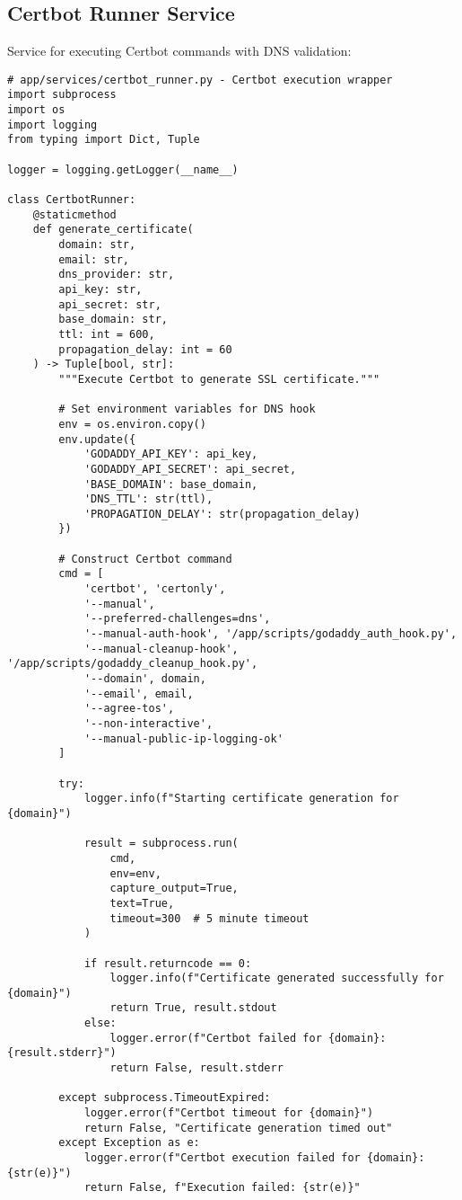 \subsection{Certbot Runner Service}

Service for executing Certbot commands with DNS validation:

\begin{verbatim}
# app/services/certbot_runner.py - Certbot execution wrapper
import subprocess
import os
import logging
from typing import Dict, Tuple

logger = logging.getLogger(__name__)

class CertbotRunner:
    @staticmethod
    def generate_certificate(
        domain: str,
        email: str,
        dns_provider: str,
        api_key: str,
        api_secret: str,
        base_domain: str,
        ttl: int = 600,
        propagation_delay: int = 60
    ) -> Tuple[bool, str]:
        """Execute Certbot to generate SSL certificate."""
        
        # Set environment variables for DNS hook
        env = os.environ.copy()
        env.update({
            'GODADDY_API_KEY': api_key,
            'GODADDY_API_SECRET': api_secret,
            'BASE_DOMAIN': base_domain,
            'DNS_TTL': str(ttl),
            'PROPAGATION_DELAY': str(propagation_delay)
        })
        
        # Construct Certbot command
        cmd = [
            'certbot', 'certonly',
            '--manual',
            '--preferred-challenges=dns',
            '--manual-auth-hook', '/app/scripts/godaddy_auth_hook.py',
            '--manual-cleanup-hook', '/app/scripts/godaddy_cleanup_hook.py',
            '--domain', domain,
            '--email', email,
            '--agree-tos',
            '--non-interactive',
            '--manual-public-ip-logging-ok'
        ]
        
        try:
            logger.info(f"Starting certificate generation for {domain}")
            
            result = subprocess.run(
                cmd,
                env=env,
                capture_output=True,
                text=True,
                timeout=300  # 5 minute timeout
            )
            
            if result.returncode == 0:
                logger.info(f"Certificate generated successfully for {domain}")
                return True, result.stdout
            else:
                logger.error(f"Certbot failed for {domain}: {result.stderr}")
                return False, result.stderr
                
        except subprocess.TimeoutExpired:
            logger.error(f"Certbot timeout for {domain}")
            return False, "Certificate generation timed out"
        except Exception as e:
            logger.error(f"Certbot execution failed for {domain}: {str(e)}")
            return False, f"Execution failed: {str(e)}"
\end{verbatim}

